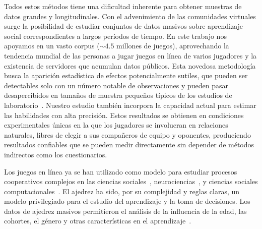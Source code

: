 \documentclass[a4paper,11pt]{book}
\theoremstyle{definition}
\begin{document}

Todos estos m\'etodos tiene una dificultad inherente para obtener muestras de datos grandes y longitudinales.
%
Con el advenimiento de las comunidades virtuales surge la posibilidad de estudiar conjuntos de datos masivos sobre aprendizaje social correspondientes a largos per\'iodos de tiempo.
%
En este trabajo nos apoyamos en un vasto corpus ($\sim4.5$ millones de juegos), aprovechando la tendencia mundial de las personas a jugar juegos en l\'inea de varios jugadores y la existencia de servidores que acumulan datos p\'ublicos.
%
Esta novedosa metodolog\'ia busca la aparici\'on estad\'istica de efectos potencialmente sutiles, que pueden ser detectables solo con un n\'umero notable de observaciones y pueden pasar desapercibidos en tama\~nos de muestra peque\~nos t\'ipicos de los estudios de laboratorio~\cite{slezak2012-doNotFearYourOpponent}.
%
Nuestro estudio tambi\'en incorpora la capacidad actual para estimar las habilidades con alta precisi\'on.
%
Estos resultados se obtienen en condiciones experimentales \'unicas en la que los jugadores se involucran en relaciones naturales, libres de elegir a sus compa\~neros de equipo y oponentes, produciendo resultados confiables que se pueden medir directamente sin depender de m\'etodos indirectos como los cuestionarios.


Los juegos en l\'inea ya se han utilizado como modelo para estudiar procesos cooperativos complejos en las ciencias sociales~\cite{Beheim2014,Johnson2009-onlineGuildsOfflineGangs}, neurociencias~\cite{slezak2012-doNotFearYourOpponent,sigman2010-chess}, y ciencias sociales computacionales~\cite{delong2013-phd_teamChemistry, shim2010-teamPerformancePrediction}.
%
El ajedrez ha sido, por su complejidad y reglas claras, un modelo privilegiado para el estudio del aprendizaje y la toma de decisiones.
%
Los datos de ajedrez masivos permitieron el an\'alisis de la influencia de la edad, las cohortes, el g\'enero y otras caracter\'isticas en el aprendizaje~\cite{chabris_glickman2006-sexDifferencesChessPerformance, roring2007-expertiseInChessAcrossLifeSpan,vaci2016-chessDatabasesAgePerformance}.

\end{document}

